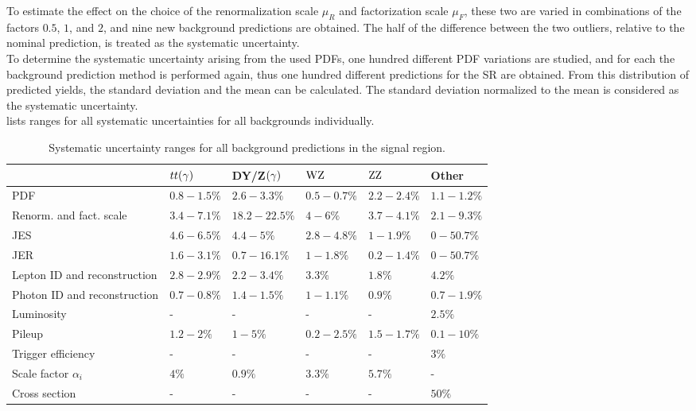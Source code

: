 To estimate the effect on the choice of the renormalization scale $\mu_R$ and factorization scale $\mu_F$, these two are varied in combinations of the factors $0.5$, $1$, and $2$, and nine new background predictions are obtained. The half of the difference between the two outliers, relative to the nominal prediction, is treated as the systematic uncertainty.\\
To determine the systematic uncertainty arising from the used PDFs, one hundred different PDF variations are studied, and for each the background prediction method is performed again, thus one hundred different predictions for the SR are obtained. From this distribution of predicted yields, the standard deviation and the mean can be calculated. The standard deviation normalized to the mean is considered as the systematic uncertainty.\\
 lists ranges for all systematic uncertainties for all backgrounds individually.
\begin{table}[tbp]
 \centering
 \caption{Systematic uncertainty ranges for all background predictions in the signal region.}
 \small
 \label{tab:systuncBKG}
 \begin{tabular}[width=\textwidth]{llllll}
                               & $tt(\gamma)$  & DY/Z$(\gamma)$  & $\mathrm{W}\mathrm{Z}$    & $\mathrm{Z}\mathrm{Z}$    & Other       \\\hline
  PDF                          & $0.8-1.5\%$ & $2.6-3.3\%$   & $0.5-0.7\%$ & $2.2-2.4\%$ & $1.1-1.2\%$ \\
  Renorm. and fact. scale      & $3.4-7.1\%$ & $18.2-22.5\%$ & $4-6\%$     & $3.7-4.1\%$ & $2.1-9.3\%$ \\
  JES                          & $4.6-6.5\%$ & $4.4-5\%$     & $2.8-4.8\%$ & $1-1.9\%$   & $0-50.7\%$  \\
  JER                          & $1.6-3.1\%$ & $0.7-16.1\%$  & $1-1.8\%$   & $0.2-1.4\%$ & $0-50.7\%$  \\
  Lepton ID and reconstruction & $2.8-2.9\%$ & $2.2-3.4\%$   & $3.3\%$     & $1.8\%$     & $4.2\%$     \\
  Photon ID and reconstruction & $0.7-0.8\%$ & $1.4-1.5\%$   & $1-1.1\%$   & $0.9\%$     & $0.7-1.9\%$ \\
  Luminosity                   & -           & -             & -           & -           & $2.5\%$     \\
  Pileup                       & $1.2-2\%$   & $1-5\%$       & $0.2-2.5\%$ & $1.5-1.7\%$ & $0.1-10\%$  \\
  Trigger efficiency           & -           & -             & -           & -           & $3\%$       \\
  Scale factor $\alpha_{i}$    & $4\%$       & $0.9\%$       & $3.3\%$     & $5.7\%$     & -           \\
  Cross section                & -           & -             & -           & -           & $50\%$      \\
  \hline
 \end{tabular}
\end{table}
